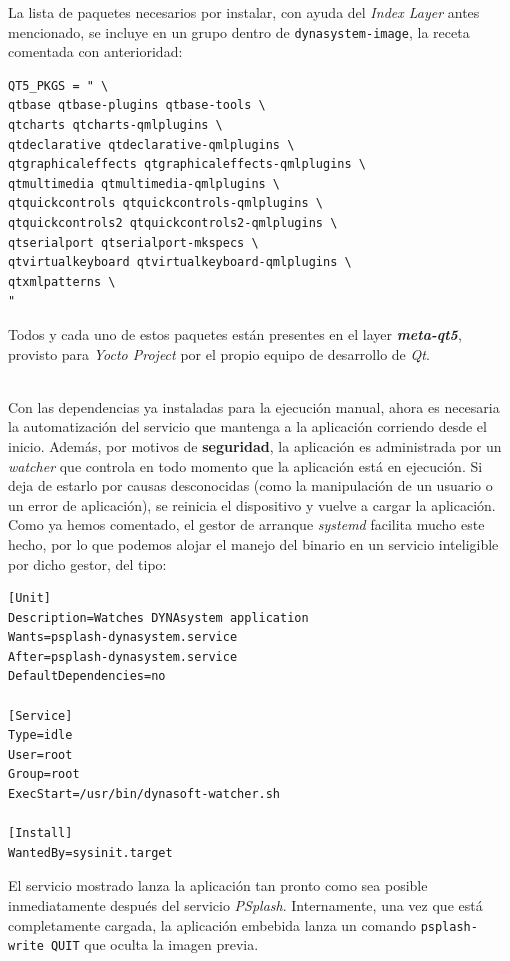 La lista de paquetes necesarios por instalar, con ayuda del \textit{Index Layer} antes mencionado, se incluye en un grupo dentro de \texttt{dynasystem-image}, la receta comentada con anterioridad:\\

\begin{lstlisting}
QT5_PKGS = " \
qtbase qtbase-plugins qtbase-tools \
qtcharts qtcharts-qmlplugins \
qtdeclarative qtdeclarative-qmlplugins \
qtgraphicaleffects qtgraphicaleffects-qmlplugins \
qtmultimedia qtmultimedia-qmlplugins \
qtquickcontrols qtquickcontrols-qmlplugins \
qtquickcontrols2 qtquickcontrols2-qmlplugins \
qtserialport qtserialport-mkspecs \
qtvirtualkeyboard qtvirtualkeyboard-qmlplugins \
qtxmlpatterns \
"
\end{lstlisting}

Todos y cada uno de estos paquetes están presentes en el layer \textit{\textbf{meta-qt5}}, provisto para \textit{Yocto Project} por el propio equipo de desarrollo de \textit{Qt}.

\noindent\makebox[\linewidth]{\rule{\textwidth}{0.4pt}}\\

Con las dependencias ya instaladas para la ejecución manual, ahora es necesaria la automatización del servicio que mantenga a la aplicación corriendo desde el inicio. Además, por motivos de \textbf{seguridad}, la aplicación es administrada por un \textit{watcher} que controla en todo momento que la aplicación está en ejecución. Si deja de estarlo por causas desconocidas (como la manipulación de un usuario o un error de aplicación), se reinicia el dispositivo y vuelve a cargar la aplicación.\\

Como ya hemos comentado, el gestor de arranque \textit{systemd} facilita mucho este hecho, por lo que podemos alojar el manejo del binario en un servicio inteligible por dicho gestor, del tipo:\\

\begin{lstlisting}
[Unit]
Description=Watches DYNAsystem application
Wants=psplash-dynasystem.service
After=psplash-dynasystem.service
DefaultDependencies=no

[Service]
Type=idle
User=root
Group=root
ExecStart=/usr/bin/dynasoft-watcher.sh

[Install]
WantedBy=sysinit.target
\end{lstlisting}

El servicio mostrado lanza la aplicación tan pronto como sea posible inmediatamente después del servicio \textit{PSplash}. Internamente, una vez que está completamente cargada, la aplicación embebida lanza un comando \texttt{psplash-write QUIT} que oculta la imagen previa.\\

